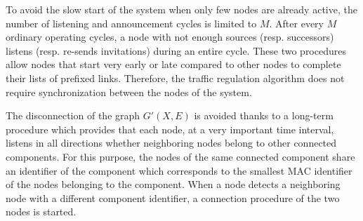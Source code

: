 \documentclass[letterpaper, 10 pt, conference]{ieeeconf}
\begin{document}
To avoid the slow start of the system when only few nodes are already active, the number of listening and announcement cycles is limited to $ M $. After every $ M $ ordinary operating cycles, a node with not enough sources (resp. successors) listens (resp. re-sends invitations) during an entire cycle. These two procedures allow nodes that start very early or late compared to other nodes to complete their lists of prefixed links. Therefore, the traffic regulation algorithm does not require synchronization between the nodes of the system.

The disconnection of the graph $G'(X, E)$ is avoided thanks to a long-term procedure which provides that each node, at a very important time interval, listens in all directions whether neighboring nodes belong to other connected components. For this purpose, the nodes of the same connected component share an identifier of the component which corresponds to the smallest MAC identifier of the nodes belonging to the component. When a node detects a neighboring node with a different component identifier, a connection procedure of the two nodes is started.
    
\end{document}
